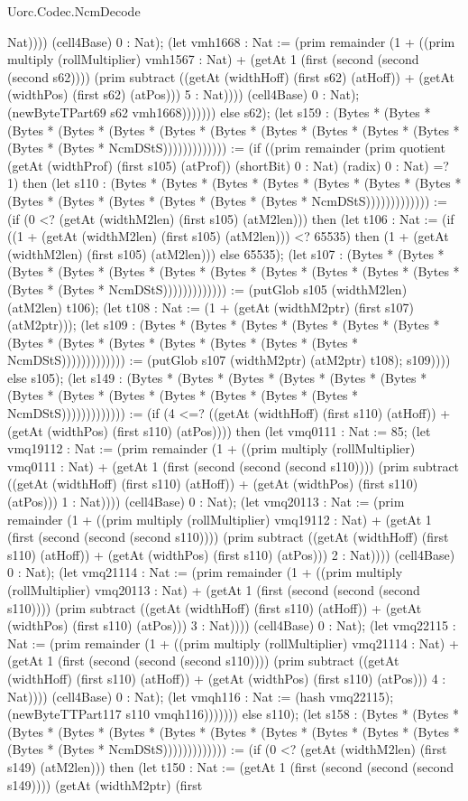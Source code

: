 \begin{lexlean}{Uorc.Codec.NcmDecode}
\begin{semanticmodule}
{Nat)))) (cell4Base) 0 : Nat); (let vmh1668 : Nat := (prim remainder (1 + ((prim multiply (rollMultiplier) vmh1567 : Nat) + (getAt 1 (first (second (second (second s62)))) (prim subtract ((getAt (widthHoff) (first s62) (atHoff)) + (getAt (widthPos) (first s62) (atPos))) 5 : Nat)))) (cell4Base) 0 : Nat); (newByteTPart69 s62 vmh1668))))))) else s62); (let s159 : (Bytes * (Bytes * (Bytes * (Bytes * (Bytes * (Bytes * (Bytes * (Bytes * (Bytes * (Bytes * (Bytes * (Bytes * (Bytes * NcmDStS))))))))))))) := (if ((prim remainder (prim quotient (getAt (widthProf) (first s105) (atProf)) (shortBit) 0 : Nat) (radix) 0 : Nat) =? 1) then (let s110 : (Bytes * (Bytes * (Bytes * (Bytes * (Bytes * (Bytes * (Bytes * (Bytes * (Bytes * (Bytes * (Bytes * (Bytes * (Bytes * NcmDStS))))))))))))) := (if (0 <? (getAt (widthM2len) (first s105) (atM2len))) then (let t106 : Nat := (if ((1 + (getAt (widthM2len) (first s105) (atM2len))) <? 65535) then (1 + (getAt (widthM2len) (first s105) (atM2len))) else 65535); (let s107 : (Bytes * (Bytes * (Bytes * (Bytes * (Bytes * (Bytes * (Bytes * (Bytes * (Bytes * (Bytes * (Bytes * (Bytes * (Bytes * NcmDStS))))))))))))) := (putGlob s105 (widthM2len) (atM2len) t106); (let t108 : Nat := (1 + (getAt (widthM2ptr) (first s107) (atM2ptr))); (let s109 : (Bytes * (Bytes * (Bytes * (Bytes * (Bytes * (Bytes * (Bytes * (Bytes * (Bytes * (Bytes * (Bytes * (Bytes * (Bytes * NcmDStS))))))))))))) := (putGlob s107 (widthM2ptr) (atM2ptr) t108); s109)))) else s105); (let s149 : (Bytes * (Bytes * (Bytes * (Bytes * (Bytes * (Bytes * (Bytes * (Bytes * (Bytes * (Bytes * (Bytes * (Bytes * (Bytes * NcmDStS))))))))))))) := (if (4 <=? ((getAt (widthHoff) (first s110) (atHoff)) + (getAt (widthPos) (first s110) (atPos)))) then (let vmq0111 : Nat := 85; (let vmq19112 : Nat := (prim remainder (1 + ((prim multiply (rollMultiplier) vmq0111 : Nat) + (getAt 1 (first (second (second (second s110)))) (prim subtract ((getAt (widthHoff) (first s110) (atHoff)) + (getAt (widthPos) (first s110) (atPos))) 1 : Nat)))) (cell4Base) 0 : Nat); (let vmq20113 : Nat := (prim remainder (1 + ((prim multiply (rollMultiplier) vmq19112 : Nat) + (getAt 1 (first (second (second (second s110)))) (prim subtract ((getAt (widthHoff) (first s110) (atHoff)) + (getAt (widthPos) (first s110) (atPos))) 2 : Nat)))) (cell4Base) 0 : Nat); (let vmq21114 : Nat := (prim remainder (1 + ((prim multiply (rollMultiplier) vmq20113 : Nat) + (getAt 1 (first (second (second (second s110)))) (prim subtract ((getAt (widthHoff) (first s110) (atHoff)) + (getAt (widthPos) (first s110) (atPos))) 3 : Nat)))) (cell4Base) 0 : Nat); (let vmq22115 : Nat := (prim remainder (1 + ((prim multiply (rollMultiplier) vmq21114 : Nat) + (getAt 1 (first (second (second (second s110)))) (prim subtract ((getAt (widthHoff) (first s110) (atHoff)) + (getAt (widthPos) (first s110) (atPos))) 4 : Nat)))) (cell4Base) 0 : Nat); (let vmqh116 : Nat := (hash vmq22115); (newByteTTPart117 s110 vmqh116))))))) else s110); (let s158 : (Bytes * (Bytes * (Bytes * (Bytes * (Bytes * (Bytes * (Bytes * (Bytes * (Bytes * (Bytes * (Bytes * (Bytes * (Bytes * NcmDStS))))))))))))) := (if (0 <? (getAt (widthM2len) (first s149) (atM2len))) then (let t150 : Nat := (getAt 1 (first (second (second (second s149)))) (getAt (widthM2ptr) (first }
\end{semanticmodule}
\end{lexlean}
